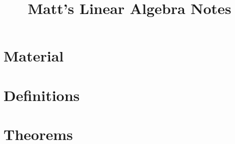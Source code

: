 \documentclass{paper}
\title{Matt's Linear Algebra Notes}
\begin{document}
\maketitle

\chapter{Material}



\chapter{Definitions}



\chapter{Theorems}


\end{document}
